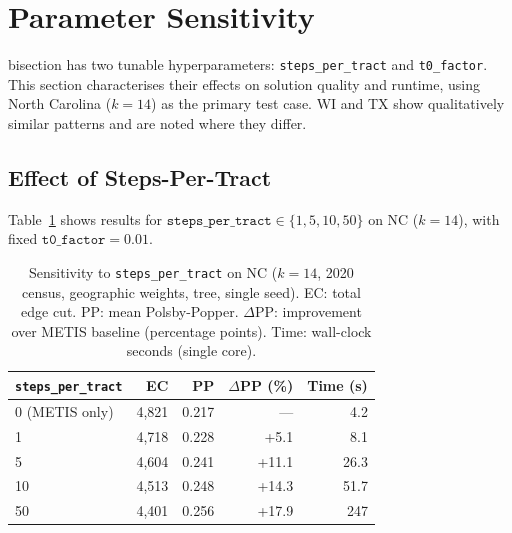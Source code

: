 \section{Parameter Sensitivity}
\label{sec:sensitivity}

\sa{} bisection has two tunable hyperparameters:
\texttt{steps\_per\_tract} and \texttt{t0\_factor}.
This section characterises their effects on solution quality and runtime,
using North Carolina ($k=14$) as the primary test case.
WI and TX show qualitatively similar patterns and are noted where they differ.

\subsection{Effect of Steps-Per-Tract}

Table~\ref{tab:steps} shows results for $\mathtt{steps\_per\_tract} \in \{1, 5, 10, 50\}$
on NC ($k=14$), with fixed $\mathtt{t0\_factor} = 0.01$.

\begin{table}[t]
\centering
\caption{%
  Sensitivity to \texttt{steps\_per\_tract} on NC ($k=14$, 2020 census,
  geographic weights, \geosec{} tree, single seed).
  EC: total edge cut. PP: mean Polsby-Popper.
  $\Delta$PP: improvement over METIS baseline (percentage points).
  Time: wall-clock seconds (single core).
}
\label{tab:steps}
\renewcommand{\arraystretch}{1.25}
\begin{tabular}{@{}lrrrr@{}}
\toprule
\texttt{steps\_per\_tract} & EC & PP & $\Delta$PP (\%) & Time (s) \\
\midrule
0 (METIS only)  & 4{,}821 & 0.217 & ---   &  4.2 \\
1               & 4{,}718 & 0.228 &  +5.1 &  8.1 \\
5               & 4{,}604 & 0.241 & +11.1 & 26.3 \\
10              & 4{,}513 & 0.248 & +14.3 & 51.7 \\
50              & 4{,}401 & 0.256 & +17.9 & 247 \\
\bottomrule
\end{tabular}
\end{table}

